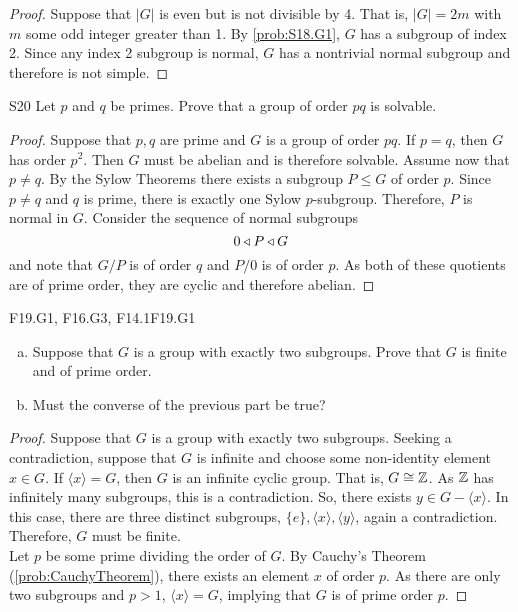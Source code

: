 \documentclass[../AlgebraQualSolutions.tex]{subfiles}
\begin{document}
	\begin{proof}
	Suppose that $|G|$ is even but is not divisible by 4. That is, $|G| = 2m$ with $m$ some odd integer greater than 1. By \ref{prob:S18.G1}, $G$ has a subgroup of index 2. Since any index 2 subgroup is normal, $G$ has a nontrivial normal subgroup and therefore is not simple.
	\end{proof}
	
	\begin{prob}{S20}{}
	Let $p$ and $q$ be primes. Prove that a group of order $pq$ is solvable.
	\end{prob}
	
	\begin{proof}
	Suppose that $p,q$ are prime and $G$ is a group of order $pq$. If $p = q$, then $G$ has order $p^2$. Then $G$ must be abelian and is therefore solvable. Assume now that $p \neq q$. By the Sylow Theorems there exists a subgroup $P \leq G$ of order $p$. Since $p \neq q$ and $q$ is prime, there is exactly one Sylow $p$-subgroup. Therefore, $P$ is normal in $G$. Consider the sequence of normal subgroups
		\[0 \triangleleft P \triangleleft G \]
	and note that $G/P$ is of order $q$ and $P/0$ is of order $p$. As both of these quotients are of prime order, they are cyclic and therefore abelian. 
	\end{proof}
	
	\begin{prob}{F19.G1, F16.G3, F14.1}{F19.G1}
	\begin{enumerate}[(a)]
	\item Suppose that $G$ is a group with exactly two subgroups. Prove that $G$ is finite and of prime order.
	\item Must the converse of the previous part be true?
	\end{enumerate}
	\end{prob}
	
	\begin{proof}
	Suppose that $G$ is a group with exactly two subgroups. Seeking a contradiction, suppose that $G$ is infinite and choose some non-identity element $x \in G$. If $\langle x \rangle = G$, then $G$ is an infinite cyclic group. That is, $G \cong \mathbb{Z}$. As $\mathbb{Z}$ has infinitely many subgroups, this is a contradiction. So, there exists $y \in G - \langle x \rangle$. In this case, there are three distinct subgroups, $\{e\}, \langle x \rangle, \langle y \rangle$, again a contradiction. Therefore, $G$ must be finite.\\
	
	Let $p$ be some prime dividing the order of $G$. By Cauchy's Theorem (\ref{prob:CauchyTheorem}), there exists an element $x$ of order $p$. As there are only two subgroups and $p > 1$, $\langle x \rangle = G$, implying that $G$ is of prime order $p$.
	\end{proof}
	
\end{document}
